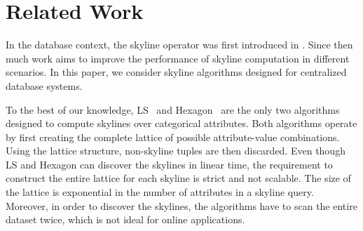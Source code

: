 \section{Related Work}\label{sec:relWork}

%    
%    
%    
%    

In the database context, the skyline operator was first introduced in \cite{borzsony2001skyline}. Since then much work aims to improve the performance of skyline computation in different scenarios. In this paper, we consider skyline algorithms designed for centralized database systems. 

To the best of our knowledge, LS~\cite{morse2007efficient} and Hexagon~\cite{preisinger2007hexagon} are the only two algorithms designed to compute skylines over categorical attributes. Both algorithms operate by first creating the complete lattice of possible attribute-value combinations. Using the lattice structure, non-skyline tuples are then discarded. Even though LS and Hexagon can discover the skylines in linear time, the requirement to construct the entire lattice for each skyline is strict and not scalable. The size of the lattice is exponential in the number of attributes in a skyline query. Moreover, in order to discover the skylines, the algorithms have to scan the entire dataset twice, which is not ideal for online applications.


